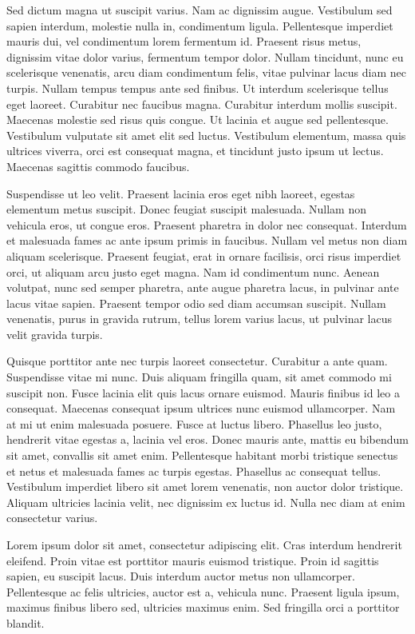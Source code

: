 Sed dictum magna ut suscipit varius. Nam ac dignissim augue. Vestibulum sed sapien interdum, molestie nulla in, condimentum ligula. Pellentesque imperdiet mauris dui, vel condimentum lorem fermentum id. Praesent risus metus, dignissim vitae dolor varius, fermentum tempor dolor. Nullam tincidunt, nunc eu scelerisque venenatis, arcu diam condimentum felis, vitae pulvinar lacus diam nec turpis. Nullam tempus tempus ante sed finibus. Ut interdum scelerisque tellus eget laoreet. Curabitur nec faucibus magna. Curabitur interdum mollis suscipit. Maecenas molestie sed risus quis congue. Ut lacinia et augue sed pellentesque. Vestibulum vulputate sit amet elit sed luctus. Vestibulum elementum, massa quis ultrices viverra, orci est consequat magna, et tincidunt justo ipsum ut lectus. Maecenas sagittis commodo faucibus.

Suspendisse ut leo velit. Praesent lacinia eros eget nibh laoreet, egestas elementum metus suscipit. Donec feugiat suscipit malesuada. Nullam non vehicula eros, ut congue eros. Praesent pharetra in dolor nec consequat. Interdum et malesuada fames ac ante ipsum primis in faucibus. Nullam vel metus non diam aliquam scelerisque. Praesent feugiat, erat in ornare facilisis, orci risus imperdiet orci, ut aliquam arcu justo eget magna. Nam id condimentum nunc. Aenean volutpat, nunc sed semper pharetra, ante augue pharetra lacus, in pulvinar ante lacus vitae sapien. Praesent tempor odio sed diam accumsan suscipit. Nullam venenatis, purus in gravida rutrum, tellus lorem varius lacus, ut pulvinar lacus velit gravida turpis.

Quisque porttitor ante nec turpis laoreet consectetur. Curabitur a ante quam. Suspendisse vitae mi nunc. Duis aliquam fringilla quam, sit amet commodo mi suscipit non. Fusce lacinia elit quis lacus ornare euismod. Mauris finibus id leo a consequat. Maecenas consequat ipsum ultrices nunc euismod ullamcorper. Nam at mi ut enim malesuada posuere. Fusce at luctus libero. Phasellus leo justo, hendrerit vitae egestas a, lacinia vel eros. Donec mauris ante, mattis eu bibendum sit amet, convallis sit amet enim. Pellentesque habitant morbi tristique senectus et netus et malesuada fames ac turpis egestas. Phasellus ac consequat tellus. Vestibulum imperdiet libero sit amet lorem venenatis, non auctor dolor tristique. Aliquam ultricies lacinia velit, nec dignissim ex luctus id. Nulla nec diam at enim consectetur varius.

Lorem ipsum dolor sit amet, consectetur adipiscing elit. Cras interdum hendrerit eleifend. Proin vitae est porttitor mauris euismod tristique. Proin id sagittis sapien, eu suscipit lacus. Duis interdum auctor metus non ullamcorper. Pellentesque ac felis ultricies, auctor est a, vehicula nunc. Praesent ligula ipsum, maximus finibus libero sed, ultricies maximus enim. Sed fringilla orci a porttitor blandit.
